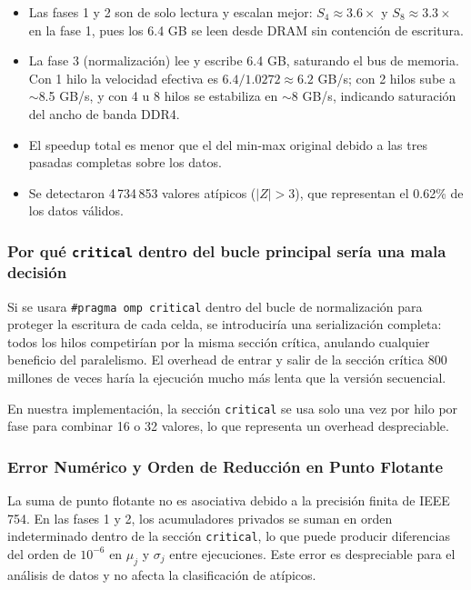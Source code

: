 \documentclass[10pt,a4paper]{article}
\begin{document}
\begin{itemize}
    \item Las fases 1 y 2 son de solo lectura y escalan mejor: $S_4 \approx
        3.6\times$ y $S_8 \approx 3.3\times$ en la fase 1, pues los 6.4 GB
        se leen desde DRAM sin contenci\'on de escritura.
    \item La fase 3 (normalizaci\'on) lee y escribe 6.4 GB, saturando el bus
        de memoria. Con 1 hilo la velocidad efectiva es
        $6.4 / 1.0272 \approx 6.2$ GB/s; con 2 hilos sube a $\sim$8.5 GB/s,
        y con 4 u 8 hilos se estabiliza en $\sim$8 GB/s, indicando saturaci\'on
        del ancho de banda DDR4.
    \item El speedup total es menor que el del min-max original debido a las
        tres pasadas completas sobre los datos.
    \item Se detectaron 4\,734\,853 valores at\'ipicos ($|Z| > 3$), que
        representan el 0.62\% de los datos v\'alidos.
\end{itemize}

\subsubsection{Por qu\'e \texttt{critical} dentro del bucle principal ser\'ia una mala decisi\'on}

Si se usara \texttt{\#pragma omp critical} dentro del bucle de normalizaci\'on
para proteger la escritura de cada celda, se introducir\'ia una serializaci\'on
completa: todos los hilos competir\'ian por la misma secci\'on cr\'itica,
anulando cualquier beneficio del paralelismo. El overhead de entrar y salir
de la secci\'on cr\'itica $800$ millones de veces har\'ia la ejecuci\'on mucho
m\'as lenta que la versi\'on secuencial.

En nuestra implementaci\'on, la secci\'on \texttt{critical} se usa solo una vez
por hilo por fase para combinar 16 o 32 valores, lo que representa un overhead
despreciable.

\subsubsection{Error Num\'erico y Orden de Reducci\'on en Punto Flotante}

La suma de punto flotante no es asociativa debido a la precisi\'on finita de
IEEE 754. En las fases 1 y 2, los acumuladores privados se suman en orden
indeterminado dentro de la secci\'on \texttt{critical}, lo que puede producir
diferencias del orden de $10^{-6}$ en $\mu_j$ y $\sigma_j$ entre ejecuciones.
Este error es despreciable para el an\'alisis de datos y no afecta la
clasificaci\'on de at\'ipicos.
\end{document}
